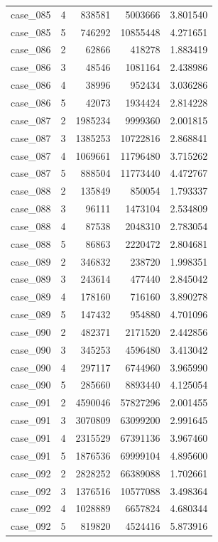 \begin{longtable}{lrrrr}
case\_085 & 4 & 838581 & 5003666 & 3.801540 \\
case\_085 & 5 & 746292 & 10855448 & 4.271651 \\
case\_086 & 2 & 62866 & 418278 & 1.883419 \\
case\_086 & 3 & 48546 & 1081164 & 2.438986 \\
case\_086 & 4 & 38996 & 952434 & 3.036286 \\
case\_086 & 5 & 42073 & 1934424 & 2.814228 \\
case\_087 & 2 & 1985234 & 9999360 & 2.001815 \\
case\_087 & 3 & 1385253 & 10722816 & 2.868841 \\
case\_087 & 4 & 1069661 & 11796480 & 3.715262 \\
case\_087 & 5 & 888504 & 11773440 & 4.472767 \\
case\_088 & 2 & 135849 & 850054 & 1.793337 \\
case\_088 & 3 & 96111 & 1473104 & 2.534809 \\
case\_088 & 4 & 87538 & 2048310 & 2.783054 \\
case\_088 & 5 & 86863 & 2220472 & 2.804681 \\
case\_089 & 2 & 346832 & 238720 & 1.998351 \\
case\_089 & 3 & 243614 & 477440 & 2.845042 \\
case\_089 & 4 & 178160 & 716160 & 3.890278 \\
case\_089 & 5 & 147432 & 954880 & 4.701096 \\
case\_090 & 2 & 482371 & 2171520 & 2.442856 \\
case\_090 & 3 & 345253 & 4596480 & 3.413042 \\
case\_090 & 4 & 297117 & 6744960 & 3.965990 \\
case\_090 & 5 & 285660 & 8893440 & 4.125054 \\
case\_091 & 2 & 4590046 & 57827296 & 2.001455 \\
case\_091 & 3 & 3070809 & 63099200 & 2.991645 \\
case\_091 & 4 & 2315529 & 67391136 & 3.967460 \\
case\_091 & 5 & 1876536 & 69999104 & 4.895600 \\
case\_092 & 2 & 2828252 & 66389088 & 1.702661 \\
case\_092 & 3 & 1376516 & 10577088 & 3.498364 \\
case\_092 & 4 & 1028889 & 6657824 & 4.680344 \\
case\_092 & 5 & 819820 & 4524416 & 5.873916 \\

\end{longtable}
